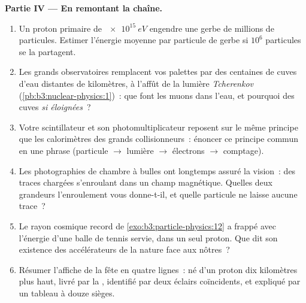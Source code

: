 \begin{problem}
\medskip\noindent\textbf{Partie IV --- En remontant la chaîne.}

\begin{enumerate}[resume]
  \item Un proton primaire de $\qty{e15}{eV}$ engendre une gerbe de
        millions de particules. Estimer l'énergie moyenne par
        particule de gerbe si $10^{6}$ particules se la partagent.
  \item Les grands observatoires remplacent vos palettes par des
        centaines de cuves d'eau distantes de kilomètres, à
        l'affût de la lumière \emph{Tcherenkov}
        (\cref{pb:b3:nuclear-physics:1})~: que font les muons dans
        l'eau, et pourquoi des cuves \emph{si éloignées}~?
  \item Votre scintillateur et son photomultiplicateur reposent
        sur le même principe que les calorimètres des grands
        collisionneurs~: énoncer ce principe commun en une phrase
        (particule $\to$ lumière $\to$ électrons $\to$ comptage).
  \item Les photographies de chambre à bulles ont longtemps assuré
        la vision~: des traces chargées s'enroulant dans un champ
        magnétique. Quelles deux grandeurs l'enroulement vous
        donne-t-il, et quelle particule ne laisse aucune trace~?
  \item Le rayon cosmique record de
        \cref{exo:b3:particle-physics:12} a frappé avec l'énergie
        d'une balle de tennis servie, dans un seul proton. Que dit
        son existence des accélérateurs de la nature face aux
        nôtres~?
  \item Résumer l'affiche de la fête en quatre lignes~: né d'un
        proton dix kilomètres plus haut, livré par la , identifié par deux éclairs coïncidents, et expliqué
        par un tableau à douze sièges.
\end{enumerate}
\end{problem}

